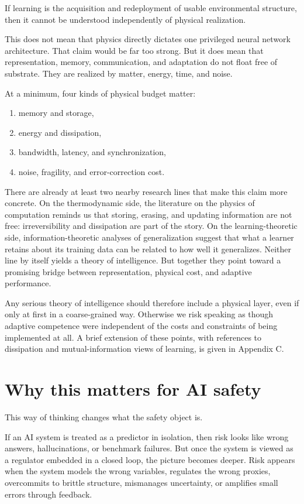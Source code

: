 \documentclass[11pt]{article}
\begin{document}
If learning is the acquisition and redeployment of usable environmental structure, then it cannot be understood independently of physical realization.

This does not mean that physics directly dictates one privileged neural network architecture. That claim would be far too strong. But it does mean that representation, memory, communication, and adaptation do not float free of substrate. They are realized by matter, energy, time, and noise.

At a minimum, four kinds of physical budget matter:

\begin{enumerate}
\item memory and storage,
\item energy and dissipation,
\item bandwidth, latency, and synchronization,
\item noise, fragility, and error-correction cost.
\end{enumerate}

There are already at least two nearby research lines that make this claim more concrete. On the thermodynamic side, the literature on the physics of computation reminds us that storing, erasing, and updating information are not free: irreversibility and dissipation are part of the story. On the learning-theoretic side, information-theoretic analyses of generalization suggest that what a learner retains about its training data can be related to how well it generalizes. Neither line by itself yields a theory of intelligence. But together they point toward a promising bridge between representation, physical cost, and adaptive performance.

Any serious theory of intelligence should therefore include a physical layer, even if only at first in a coarse-grained way. Otherwise we risk speaking as though adaptive competence were independent of the costs and constraints of being implemented at all. A brief extension of these points, with references to dissipation and mutual-information views of learning, is given in Appendix C.

\section{Why this matters for AI safety}

This way of thinking changes what the safety object is.

If an AI system is treated as a predictor in isolation, then risk looks like wrong answers, hallucinations, or benchmark failures. But once the system is viewed as a regulator embedded in a closed loop, the picture becomes deeper. Risk appears when the system models the wrong variables, regulates the wrong proxies, overcommits to brittle structure, mismanages uncertainty, or amplifies small errors through feedback.
\end{document}
